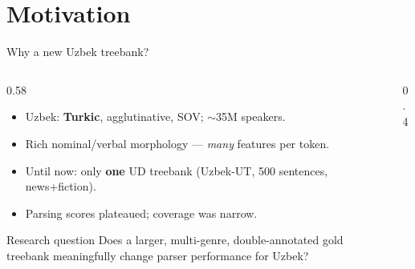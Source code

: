 \documentclass[10pt,aspectratio=169]{beamer}
\begin{document}
\section{Motivation}
\begin{frame}{Why a new Uzbek treebank?}
   \begin{columns}[T,onlytextwidth]
     \begin{column}{0.58\textwidth}
       \begin{itemize}
         \item Uzbek: \textbf{Turkic}, agglutinative, SOV; $\sim$35M speakers.
         \item Rich nominal/verbal morphology — \emph{many} features per token.
         \item Until now: only \textbf{one} UD treebank (Uzbek-UT, 500 sentences, news+fiction).
         \item Parsing scores plateaued; coverage was narrow.
       \end{itemize}
       \vspace{0.4em}
       \begin{block}{Research question}
         Does a larger, multi-genre, double-annotated gold treebank meaningfully change parser performance for Uzbek?
       \end{block}
     \end{column}
     \begin{column}{0.4\textwidth}
       \centering
     \end{column}
   \end{columns}
\end{frame}
\end{document}
